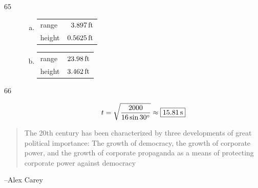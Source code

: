 \documentclass{exam}
\newcommand{\dg}{\ensuremath{^\circ}}
\begin{document}
\begin{description}
      \item[65]
        \begin{enumerate}[(a)]
          \item 
            \begin{tabular}[H]{lr}
              \toprule
              range  & $\unit[3.897]{ft}$ \\
              height & $\unit[0.5625]{ft}$ \\
              \bottomrule
            \end{tabular}

          \item 
            \begin{tabular}[H]{lr}
              \toprule
              range  & $\unit[23.98]{ft}$ \\
              height & $\unit[3.462]{ft}$ \\
              \bottomrule
            \end{tabular}
        \end{enumerate}

      \item[66]
        \[
          t = \sqrt{ \frac{2000}{16 \sin 30 \dg}} \approx \boxed{ \unit[15.81]{s} }
        \]

    \end{description}

  \else
    \vspace{7 cm}
    \begin{quote}
      \begin{em}
        The 20th century has been characterized by three developments of great political importance: The growth of
        democracy, the growth of corporate power, and the growth of corporate propaganda as a means of protecting
        corporate power against democracy
      \end{em}
    \end{quote}
    \hspace{1 cm} --Alex Carey
  \fi
\end{document}
